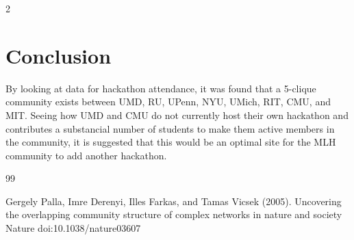 \documentclass[twoside]{article}
\begin{document}
\begin{multicols}{2}

\section{Conclusion}

By looking at data for hackathon attendance, it was found that a 5-clique 
community exists between UMD, RU, UPenn, NYU, UMich, RIT, CMU, and MIT.
Seeing how UMD and CMU do not currently host their own hackathon and contributes a
substancial number of students to make them active members in the community, it is 
suggested that this would be an optimal site for the MLH community to add another
hackathon.


\begin{thebibliography}{99} %

Gergely Palla, Imre Derenyi, Illes Farkas, and Tamas Vicsek (2005).
\newblock Uncovering the overlapping community structure of complex networks in nature and society Nature 
\newblock doi:10.1038/nature03607

\end{thebibliography}


\end{multicols}
\end{document}
